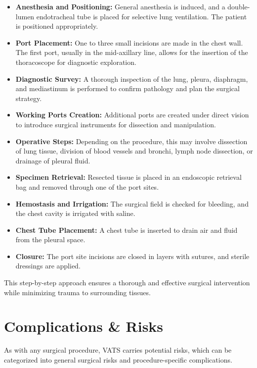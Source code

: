 \begin{itemize}
  \item \textbf{Anesthesia and Positioning:} General anesthesia is induced, and a double-lumen endotracheal tube is placed for selective lung ventilation. The patient is positioned appropriately.
  \item \textbf{Port Placement:} One to three small incisions are made in the chest wall. The first port, usually in the mid-axillary line, allows for the insertion of the thoracoscope for diagnostic exploration.
  \item \textbf{Diagnostic Survey:} A thorough inspection of the lung, pleura, diaphragm, and mediastinum is performed to confirm pathology and plan the surgical strategy.
  \item \textbf{Working Ports Creation:} Additional ports are created under direct vision to introduce surgical instruments for dissection and manipulation.
  \item \textbf{Operative Steps:} Depending on the procedure, this may involve dissection of lung tissue, division of blood vessels and bronchi, lymph node dissection, or drainage of pleural fluid.
  \item \textbf{Specimen Retrieval:} Resected tissue is placed in an endoscopic retrieval bag and removed through one of the port sites.
  \item \textbf{Hemostasis and Irrigation:} The surgical field is checked for bleeding, and the chest cavity is irrigated with saline.
  \item \textbf{Chest Tube Placement:} A chest tube is inserted to drain air and fluid from the pleural space.
  \item \textbf{Closure:} The port site incisions are closed in layers with sutures, and sterile dressings are applied.
\end{itemize}

This step-by-step approach ensures a thorough and effective surgical intervention while minimizing trauma to surrounding tissues.

\section*{Complications \& Risks}
As with any surgical procedure, VATS carries potential risks, which can be categorized into general surgical risks and procedure-specific complications.

